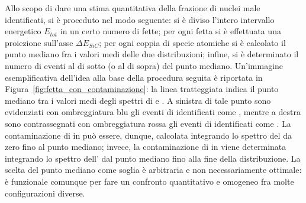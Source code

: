 Allo scopo di dare una stima quantitativa della frazione di nuclei male identificati, si è proceduto nel modo seguente: si è diviso l'intero intervallo energetico $E_{tot}$ in un certo numero di fette; per ogni fetta si è effettuata una proiezione sull'asse $\Delta E_{SiC}$; per ogni coppia di specie atomiche si è calcolato il punto mediano fra i valori medi delle due distribuzioni; infine, si è determinato il numero di eventi al di sotto (o al di sopra) del punto mediano.
Un'immagine esemplificativa dell'idea alla base della procedura seguita è riportata in Figura~\ref{fig:fetta_con_contaminazione}: la linea tratteggiata indica il punto mediano tra i valori medi degli spettri di  e .
A sinistra di tale punto sono evidenziati con ombreggiatura blu gli eventi di  identificati come , mentre a destra sono contrassegnati con ombreggiatura rossa gli eventi di  identificati come .
La contaminazione di  in  può essere, dunque, calcolata integrando lo spettro del  da zero fino al punto mediano; invece, la contaminazione di  in  viene determinata integrando lo spettro dell' dal punto mediano fino alla fine della distribuzione.
La scelta del punto mediano come soglia è arbitraria e non necessariamente ottimale: è funzionale comunque per fare un confronto quantitativo e omogeneo fra molte configurazioni diverse.

